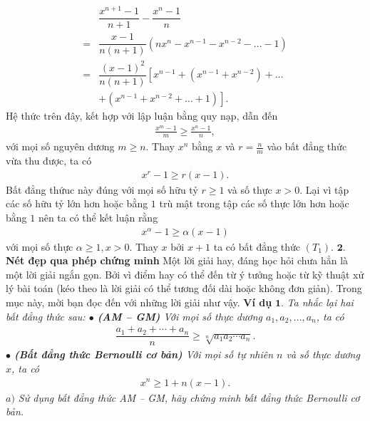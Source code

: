 \begin{multicols}{2}
\begin{align*}
			&\dfrac{{{x^{n + 1}} - 1}}{{n + 1}} - \dfrac{{{x^n} - 1}}{n} \\
			= &\dfrac{{x - 1}}{{n(n + 1)}}\left( {n{x^n} - {x^{n - 1}} - {x^{n - 2}} -  \ldots  - 1} \right)\\
			= &\dfrac{{{{(x - 1)}^2}}}{{n(n + 1)}}\left[ {x^{n - 1}} + \left( {{x^{n - 1}} + {x^{n - 2}}} \right) +  \ldots \right. \\
			& \left.+ \left( {{x^{n - 1}} + {x^{n - 2}} +  \ldots  + 1} \right) \right].
		\end{align*}
		Hệ thức trên đây, kết hợp với lập luận bằng quy nạp, dẫn đến
		\begin{align*}
			\frac{{{x^m} - 1}}{m} \geq \frac{{{x^n} - 1}}{n},
		\end{align*}
		với mọi số nguyên dương $m \geq n$. Thay $x^n$ bằng $x$ và $r= \frac{n}{m}$ vào bất đẳng thức vừa thu được, ta có
		\begin{align*}
			{x^r} - 1 \geq  r\left( {x - 1} \right).
		\end{align*}
		Bất đẳng thứuc này đúng với mọi số hữu tỷ $r \geq 1$ và  số thực $x>0$. Lại vì tập các số hữu tỷ
		lớn hơn hoặc bằng $1$ trù mật trong tập các số thực lớn hơn hoặc bằng $1$ nên ta có thể kết luận rằng
		\begin{align*}
			{x^{\alpha} } - 1 \geq  \alpha \left( {x - 1} \right)
		\end{align*}
		với mọi số thực $\alpha \geq 1,x>0$. Thay $x$ bởi $x+1$ ta có bất đẳng thức $(T_1)$. 
		\vskip 0.1cm
		$\pmb{2.}$ \textbf{\color{hoccungpi}Nét đẹp qua phép chứng minh}
		\vskip 0.1cm
		Một lời giải hay, đáng học hỏi chưa hẳn là một lời giải ngắn gọn. Bởi vì điểm hay có thể đến từ ý tưởng hoặc từ kỹ thuật xử lý bài toán (kéo theo là lời giải có thể tương đối dài hoặc không đơn giản). Trong mục này, mời bạn đọc đến với những lời giải như vậy.
		\vskip 0.1cm
		\textbf{\color{hoccungpi}Ví dụ} $\pmb{1.}$
		\textit{Ta nhắc lại hai bất đẳng thức sau:
		\vskip 0.1cm
		$\bullet$ \textbf{\color{hoccungpi}(AM -- GM)} Với mọi số thực dương $a_1, a_2, \ldots, a_n$, ta có
		\begin{align*}
			\dfrac{a_1+a_2+\cdots+a_n}{n} \geq \sqrt[n]{a_1a_2\cdots a_n}.
		\end{align*}
		$\bullet$ \textbf{\color{hoccungpi}(Bất đẳng thức Bernoulli cơ bản)} Với mọi số tự nhiên $n$ và số thực dương $x$, ta có
		\begin{align*}
			x^n \geq 1+n(x-1).
		\end{align*}	
		$a)$ Sử dụng bất đẳng thức AM -- GM, hãy chứng minh bất đẳng thức Bernoulli cơ bản.
}
\end{multicols}
